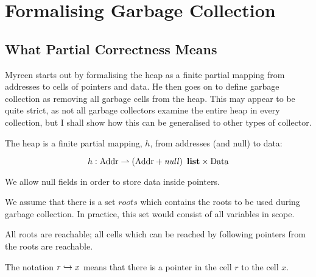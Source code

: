 \chapter{Formalising Garbage Collection}

\section{What Partial Correctness Means}

Myreen starts out by formalising the \gls{heap} as a finite partial
mapping from addresses to \glspl{cell} of \glspl{pointer} and
\gls{data}. He then goes on to define garbage collection as removing
all \gls{garbage} \glspl{cell} from the
\gls{heap}\cite{Myreen10}. This may appear to be quite strict, as not
all \glspl{garbage collector} examine the entire \gls{heap} in every
collection, but I shall show how this can be generalised to other
types of \gls{collector}.

\begin{definition}[Heap]
  The heap is a finite partial mapping, $h$, from addresses (and null) to data:

  \[h : \addr \finparmap \listof{\left(\addr + \nullp\right)} \x \data\]

  We allow null fields in order to store data inside pointers.
\end{definition}

We assume that there is a set $roots$ which contains the \glspl{root}
to be used during \gls{garbage collection}. In practice, this set
would consist of all variables in scope.

\begin{definition}[Reachable]
  All roots are reachable; all cells which can be reached by following
  pointers from the roots are reachable.

  \begin{minipage}{.5\textwidth}
    \begin{prooftree}
    \end{prooftree}
  \end{minipage}
  \begin{minipage}{.5\textwidth}
    \begin{prooftree}
    \end{prooftree}
  \end{minipage}

  The notation $r \pointsto x$ means that there is a pointer in the
  cell $r$ to the cell $x$.
\end{definition}

